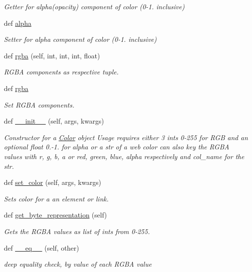 \begin{DoxyCompactItemize}
\begin{DoxyCompactList}\small\item\em Getter for alpha(opacity) component of color (0-\/1. inclusive) \end{DoxyCompactList}\item 
def \hyperlink{classbridges_1_1color_1_1_color_ab57c1e881ebb14bccefb870a9fa2ac1d}{alpha}
\begin{DoxyCompactList}\small\item\em Setter for alpha component of color (0-\/1. inclusive) \end{DoxyCompactList}\item 
def \hyperlink{classbridges_1_1color_1_1_color_a7653dfb80aa5ec25ed14314ffa79d1f2}{rgba} (self, int, int, int, float)
\begin{DoxyCompactList}\small\item\em R\+G\+BA components as respective tuple. \end{DoxyCompactList}\item 
def \hyperlink{classbridges_1_1color_1_1_color_aa3d8dcfea52715f28400b08bf15e94ab}{rgba}
\begin{DoxyCompactList}\small\item\em Set R\+G\+BA components. \end{DoxyCompactList}\item 
def \hyperlink{classbridges_1_1color_1_1_color_aacbbede0aceb8f1ca36d78379614bb1a}{\+\_\+\+\_\+init\+\_\+\+\_\+} (self, args, kwargs)
\begin{DoxyCompactList}\small\item\em Constructor for a \hyperlink{classbridges_1_1color_1_1_color}{Color} object Usage requires either 3 ints 0-\/255 for R\+GB and an optional float 0.-\/1. for alpha or a str of a web color can also key the R\+G\+BA values with r, g, b, a or red, green, blue, alpha respectively and col\+\_\+name for the str. \end{DoxyCompactList}\item 
def \hyperlink{classbridges_1_1color_1_1_color_a99b17a81feb1737f8b29c93ae9ef4bc8}{set\+\_\+color} (self, args, kwargs)
\begin{DoxyCompactList}\small\item\em Sets color for a an element or link. \end{DoxyCompactList}\item 
def \hyperlink{classbridges_1_1color_1_1_color_a30bc8e2023395c584eb256972abc7c1b}{get\+\_\+byte\+\_\+representation} (self)
\begin{DoxyCompactList}\small\item\em Gets the R\+G\+BA values as list of ints from 0-\/255. \end{DoxyCompactList}\item 
def \hyperlink{classbridges_1_1color_1_1_color_ae5677a0858252f0b33da13866fb62786}{\+\_\+\+\_\+eq\+\_\+\+\_\+} (self, other)
\begin{DoxyCompactList}\small\item\em deep equality check, by value of each R\+G\+BA value \end{DoxyCompactList}\end{DoxyCompactItemize}
